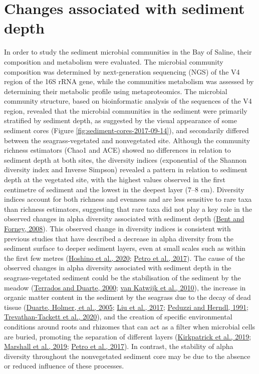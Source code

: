 \documentclass[
  12 pt,
]{book}
\begin{document}
\hypertarget{section-sediment-depth}{%
\section{Changes associated with sediment depth}\label{section-sediment-depth}}

In order to study the sediment microbial communities in the Bay of Saline, their composition and metabolism were evaluated. The microbial community composition was determined by next-generation sequencing (NGS) of the V4 region of the 16S rRNA gene, while the communities metabolism was assessed by determining their metabolic profile using metaproteomics. The microbial community structure, based on bioinformatic analysis of the sequences of the V4 region, revealed that the microbial communities in the sediment were primarily stratified by sediment depth, as suggested by the visual appearance of some sediment cores (Figure \ref{fig:sediment-cores-2017-09-14}), and secondarily differed between the seagrass-vegetated and nonvegetated site. Although the community richness estimators (Chao1 and ACE) showed no differences in relation to sediment depth at both sites, the diversity indices (exponential of the Shannon diversity index and Inverse Simpson) revealed a pattern in relation to sediment depth at the vegetated site, with the highest values observed in the first centimetre of sediment and the lowest in the deepest layer (7--8 \si{\cm}). Diversity indices account for both richness and evenness and are less sensitive to rare taxa than richness estimators, suggesting that rare taxa did not play a key role in the observed changes in alpha diversity associated with sediment depth (\protect\hyperlink{ref-Bent2008}{Bent and Forney, 2008}). This observed change in diversity indices is consistent with previous studies that have described a decrease in alpha diversity from the sediment surface to deeper sediment layers, even at small scales such as within the first few metres (\protect\hyperlink{ref-Hoshino2020}{Hoshino et al., 2020}; \protect\hyperlink{ref-Petro2017}{Petro et al., 2017}). The cause of the observed changes in alpha diversity associated with sediment depth in the seagrass-vegetated sediment could be the stabilisation of the sediment by the meadow (\protect\hyperlink{ref-Terrados2000}{Terrados and Duarte, 2000}; \protect\hyperlink{ref-vanKatwijk2010}{van Katwijk et al., 2010}), the increase in organic matter content in the sediment by the seagrass due to the decay of dead tissue (\protect\hyperlink{ref-Duarte2005}{Duarte, Holmer, et al., 2005}; \protect\hyperlink{ref-Liu2017}{Liu et al., 2017}; \protect\hyperlink{ref-Peduzzi1991}{Peduzzi and Herndl, 1991}; \protect\hyperlink{ref-Trevathan-Tackett2020}{Trevathan-Tackett et al., 2020}), and the creation of specific environmental conditions around roots and rhizomes that can act as a filter when microbial cells are buried, promoting the separation of different layers (\protect\hyperlink{ref-Kirkpatrick2019}{Kirkpatrick et al., 2019}; \protect\hyperlink{ref-Marshall2019}{Marshall et al., 2019}; \protect\hyperlink{ref-Petro2017}{Petro et al., 2017}). In contrast, the stability of alpha diversity throughout the nonvegetated sediment core may be due to the absence or reduced influence of these processes.
\end{document}
